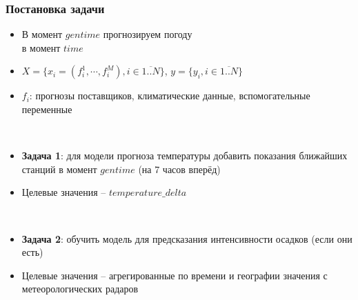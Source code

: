 \documentclass{beamer}
\begin{document}
\begin{frame}\frametitle{\large Постановка задачи}

\small{
\begin{itemize}
    \item В момент $gentime$ прогнозируем погоду \\ в момент $time$
    \item $X = \{x_i = (f^1_{i}, \cdots, f^M_i), i \in \overline{1..N}\}$, $y = \{y_i, i \in \overline{1..N}\}$
    \item $f_i$: прогнозы поставщиков, климатические данные, вспомогательные переменные
    
    \hspace\\
    
    \item \textbf{Задача 1}: для модели прогноза температуры добавить показания ближайших станций в момент $gentime$ (на 7 часов вперёд)
    \item Целевые значения -- $temperature\_delta$ %
    
    \hspace\\
    
    \item \textbf{Задача 2}: обучить модель для предсказания интенсивности осадков (если они есть)
    \item Целевые значения -- агрегированные по времени и географии значения с метеорологических радаров

\end{itemize}

}
\end{frame}
\end{document}
